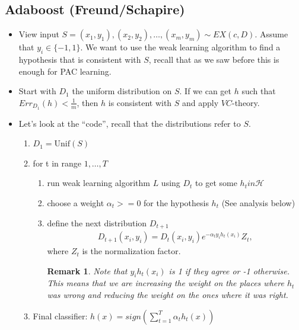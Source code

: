 \documentclass[12pt, letterpaper]{article}
\numberwithin{equation}{section} %
\newcommand{\mc}{\mathcal}
\newtheorem{remark}[theorem]{Remark}
\theoremstyle{definition}
\theoremstyle{remark}
\begin{document}
\subsection{Adaboost (Freund/Schapire)}
\begin{itemize}
\item View input $S = (x_1, y_1), (x_2, y_2), \ldots, (x_m, y_m) \sim EX(c,D)$. Assume that $y_i\in\lbrace-1,1\rbrace$. We want to use the weak learning algorithm to find a hypothesis that is consistent with $S$, recall that as we saw before this is enough for PAC learning.
\item Start with $D_1$ the uniform distribution on $S$. If we can get $h$ such that $Err_{D_1}(h)<\frac1m$, then $h$ is consistent with $S$ and apply $VC$-theory.
\item Let's look at the ``code'', recall that the distributions refer to $S$.
\begin{enumerate}[]
\item $D_1 = \textrm{Unif}(S)$
\item for t in range $1,\ldots, T$
    \begin{enumerate}[-]
    \item run weak learning algorithm $L$ using $D_t$ to get some $h_t in \mc H$
    \item choose a weight $\alpha_t >= 0$ for the hypothesis $h_t$ (See analysis below)
    \item define the next distribution $D_{t+1}$
        \begin{align}D_{t+1}(x_i, y_i) = D_t(x_i, y_i)e^{-\alpha_ty_ih_t(x_i)}{Z_t},\end{align}
        where $Z_t$ is the normalization factor.
        \begin{remark}
        Note that $y_ih_t(x_i)$ is 1 if they agree or -1 otherwise. This means that we are increasing the weight on the places where $h_t$ was  wrong and reducing the weight on the ones where it was right.
        \end{remark}
    \end{enumerate}
\item Final classifier: $h(x) = sign(\sum_{t=1}^T\alpha_th_t(x))$
\end{enumerate}
\end{itemize}
\end{document}

